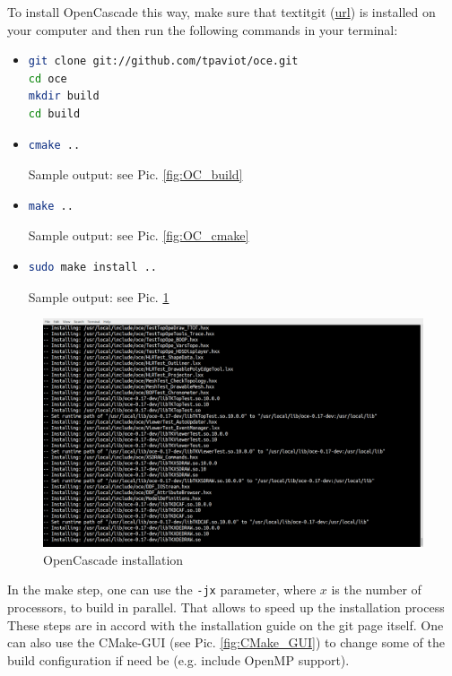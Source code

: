 \documentclass[11pt,a4paper,bibtotoc,idxtotoc,headsepline,footsepline,footexclude,DIV13,oneside]{scrbook}
\begin{document}
To install OpenCascade this way, make sure that textit{git} (\href{https://git-scm.com/}{url}) is installed on your computer and then run the following commands in your terminal:
\begin{itemize}
\item \begin{lstlisting}[language=bash]
git clone git://github.com/tpaviot/oce.git
cd oce
mkdir build
cd build
\end{lstlisting}
	
\item 
\begin{lstlisting}[language=bash]
cmake .. 
\end{lstlisting}	
Sample output: see Pic. \ref{fig:OC_build}
\item 
\begin{lstlisting}[language=bash]
make .. 
\end{lstlisting}	
Sample output: see Pic. \ref{fig:OC_cmake}
\item 
\begin{lstlisting}[language=bash]
sudo make install .. 
\end{lstlisting}	
Sample output: see Pic. \ref{fig:OC_install}
\end{itemize}

\begin{figure}
\centering
\includegraphics[scale=0.3]{img/OC_Install2.png}
\caption{OpenCascade installation}
\label{fig:OC_install}
\end{figure}
	In the make step, one can use the \texttt{-jx} parameter, where $x$ is the number of processors, to build in parallel. That allows to speed up the installation process These steps are in accord with the installation guide on the git page itself. One can also use the CMake-GUI (see Pic. \ref{fig:CMake_GUI}) to change some of the build configuration if need be (e.g. include OpenMP support).
	
\end{document}
